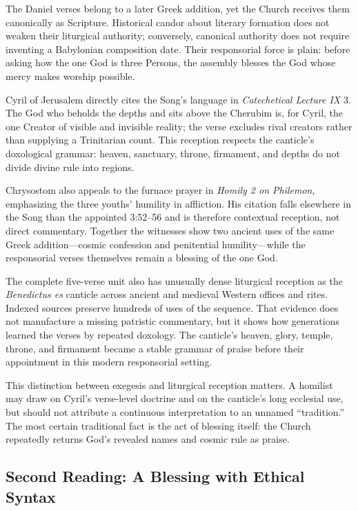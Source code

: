 \begin{deepstudy}
The Daniel verses belong to a later Greek addition, yet the Church receives them canonically as Scripture. Historical candor about literary formation does not weaken their liturgical authority; conversely, canonical authority does not require inventing a Babylonian composition date. Their responsorial force is plain: before asking how the one God is three Persons, the assembly blesses the God whose mercy makes worship possible.

Cyril of Jerusalem directly cites the Song's language in \emph{Catechetical Lecture IX} 3. The God who beholds the depths and sits above the Cherubim is, for Cyril, the one Creator of visible and invisible reality; the verse excludes rival creators rather than supplying a Trinitarian count. This reception respects the canticle's doxological grammar: heaven, sanctuary, throne, firmament, and depths do not divide divine rule into regions.

Chrysostom also appeals to the furnace prayer in \emph{Homily 2 on Philemon}, emphasizing the three youths' humility in affliction. His citation falls elsewhere in the Song than the appointed 3:52--56 and is therefore contextual reception, not direct commentary. Together the witnesses show two ancient uses of the same Greek addition---cosmic confession and penitential humility---while the responsorial verses themselves remain a blessing of the one God.

The complete five-verse unit also has unusually dense liturgical reception as the \emph{Benedictus es} canticle across ancient and medieval Western offices and rites. Indexed sources preserve hundreds of uses of the sequence. That evidence does not manufacture a missing patristic commentary, but it shows how generations learned the verses by repeated doxology. The canticle's heaven, glory, temple, throne, and firmament became a stable grammar of praise before their appointment in this modern responsorial setting.

This distinction between exegesis and liturgical reception matters. A homilist may draw on Cyril's verse-level doctrine and on the canticle's long ecclesial use, but should not attribute a continuous interpretation to an unnamed “tradition.” The most certain traditional fact is the act of blessing itself: the Church repeatedly returns God's revealed names and cosmic rule as praise.

\subsection*{Second Reading: A Blessing with Ethical Syntax\enspace{}}


\end{deepstudy}
